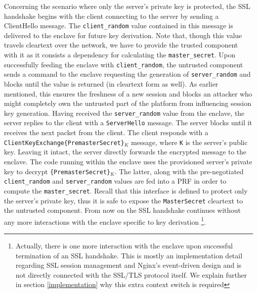 \documentclass[../main.tex]{subfiles}
\begin{document}
Concerning the scenario where only the server's private key is protected, the
SSL handshake begins with the client connecting to the server by sending a
ClientHello message. The \texttt{client\_random} value contained in this
message is delivered to the enclave for future key derivation. Note that,
though this value travels cleartext over the network, we have to provide the
trusted component with it as it consists a dependency for calculating the
\texttt{master\_secret}. Upon successfully feeding the enclave with
\texttt{client\_random}, the untrusted component sends a command to the enclave
requesting the generation of \texttt{server\_random} and blocks until the value
is returned (in cleartext form as well). As earlier mentioned, this ensures the
freshness of a new session and blocks an attacker who might completely own the
untrusted part of the platform from influencing session key generation. Having
received the \texttt{server\_random} value from the enclave, the server replies
to the client with a \texttt{ServerHello} message. The server blocks until it
receives the next packet from the client. The client responds with a
\texttt{ClientKeyExchange\{PremasterSecret\}$_K$} message, where \texttt{K} is
the server's public key. Leaving it intact, the server directly forwards the
encrypted message to the enclave. The code running within the enclave uses the
provisioned server's private key to decrypt \texttt{\{PremasterSecret\}$_K$}.
The latter, along with the pre-negotiated \texttt{client\_random} and
\texttt{server\_random} values are fed into a PRF in order to compute the
\texttt{master\_secret}. Recall that this interface is defined to protect only
the server's private key, thus it is safe to expose the \texttt{MasterSecret}
cleartext to the untrusted component. From now on the SSL handshake continues
without any more interactions with the enclave specific to key derivation
\footnote{Actually, there is one more interaction with the enclave upon
successful termination of an SSL handshake. This is mostly an implementation
detail regarding SSL session management and Nginx's event-driven design and is
not directly connected with the SSL/TLS protocol itself. We explain further in
section \ref{implementation} why this extra context switch is required}.
\end{document}
